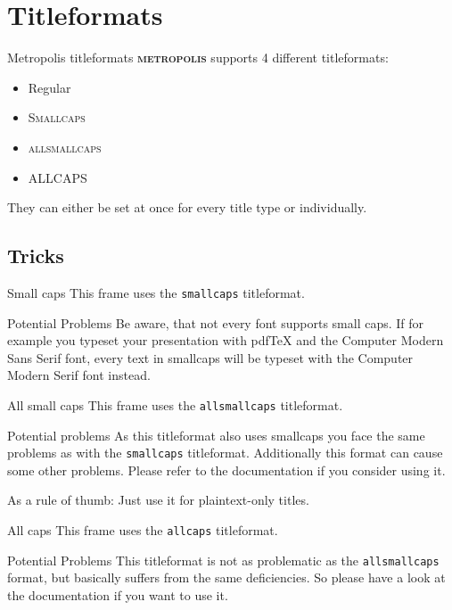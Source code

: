 \documentclass[10pt]{beamer}
\newcommand{\themename}{\textbf{\textsc{metropolis}}\xspace}
\begin{document}
\section{Titleformats}

\begin{frame}{Metropolis titleformats}
	\themename supports 4 different titleformats:
	\begin{itemize}
		\item Regular
		\item \textsc{Smallcaps}
		\item \textsc{allsmallcaps}
		\item ALLCAPS
	\end{itemize}
	They can either be set at once for every title type or individually.
\end{frame}

\subsection{Tricks}

{
\begin{frame}{Small caps}
	This frame uses the \texttt{smallcaps} titleformat.

	\begin{alertblock}{Potential Problems}
		Be aware, that not every font supports small caps. If for example you typeset your presentation with pdfTeX and the Computer Modern Sans Serif font, every text in smallcaps will be typeset with the Computer Modern Serif font instead.
	\end{alertblock}
\end{frame}
}

{
\begin{frame}{All small caps}
	This frame uses the \texttt{allsmallcaps} titleformat.

	\begin{alertblock}{Potential problems}
		As this titleformat also uses smallcaps you face the same problems as with the \texttt{smallcaps} titleformat. Additionally this format can cause some other problems. Please refer to the documentation if you consider using it.

		As a rule of thumb: Just use it for plaintext-only titles.
	\end{alertblock}
\end{frame}
}

{
\begin{frame}{All caps}
	This frame uses the \texttt{allcaps} titleformat.

	\begin{alertblock}{Potential Problems}
		This titleformat is not as problematic as the \texttt{allsmallcaps} format, but basically suffers from the same deficiencies. So please have a look at the documentation if you want to use it.
	\end{alertblock}
\end{frame}
}
\end{document}
